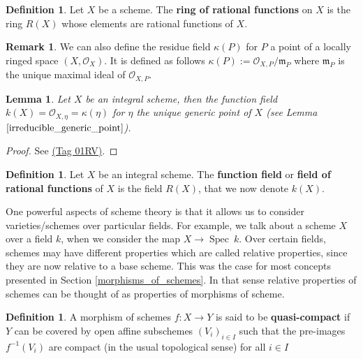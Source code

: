 \documentclass{article}
\theoremstyle{plain}
\newtheorem{lemma}[theorem]{Lemma}
\theoremstyle{definition}
\newtheorem{definition}[theorem]{Definition}
\newtheorem{remark}{Remark}
\DeclareMathOperator{\Spec}{Spec}
\begin{document}
\begin{definition}
    Let $X$ be a scheme. The \textbf{ring of rational functions} on $X$ is the ring $R(X)$ whose elements are rational functions of $X$.
\end{definition}

\begin{remark}
    We can also define the residue field $\kappa(P)$ for $P$ a point of a locally ringed space $(X,\mathcal{O}_X)$. It is defined as follows $\kappa(P) := \mathcal{O}_{X,P}/\mathfrak{m}_P$ where $\mathfrak{m}_P$ is the unique maximal ideal of $\mathcal{O}_{X,P}$.
\end{remark}

\begin{lemma}
\label{function_field_residue_field}
    Let $X$ be an integral scheme, then the function field $k(X) = \mathcal{O}_{X,\eta} = \kappa(\eta)$ for $\eta$ the unique generic point of $X$ (see Lemma $\ref{irreducible_generic_point}$).
\end{lemma}
\begin{proof}
    See \cite{Stacks}\href{https://stacks.math.columbia.edu/tag/01RV}{(Tag 01RV)}.
\end{proof}
\begin{definition}
    Let $X$ be an integral scheme. The \textbf{function field} or \textbf{field of rational functions} of $X$ is the field $R(X)$, that we now denote $k(X)$.
\end{definition}






\noindent One powerful aspects of scheme theory is that it allows us to consider varieties/schemes over particular fields.
For example, we talk about a scheme $X$ over a field $k$, when we consider the map $X\rightarrow \Spec\:k$.
Over certain fields, schemes may have different properties which are called relative properties, since they are now relative to a base scheme.
This was the case for most concepts presented in Section \ref{morphisms_of_schemes}. 
In that sense relative properties of schemes can be thought of as properties of morphisms of scheme.

\begin{definition}
    A morphism of schemes $f:X\rightarrow Y$ is said to be \textbf{quasi-compact} if $Y$ can be covered by open affine subschemes $(V_i)_{i\in I}$ such that the pre-images $f^{-1}(V_i)$ are compact (in the usual topological sense) for all $i\in I$
\end{definition}
\end{document}
